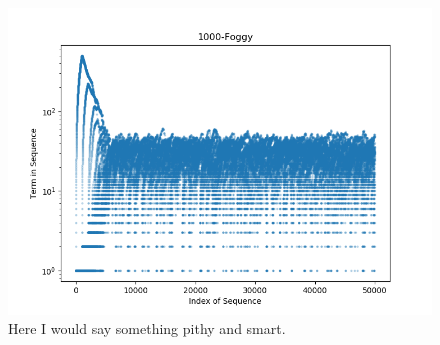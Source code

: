 \documentclass{article}
\begin{document}
\begin{figure}[thpb]
 \centering
 \includegraphics[scale=0.8]{figures/foggyExample.png}
 \caption{Here I would say something pithy and smart. \label{fig:foggyExample}}
\end{figure}

  
\end{document}
